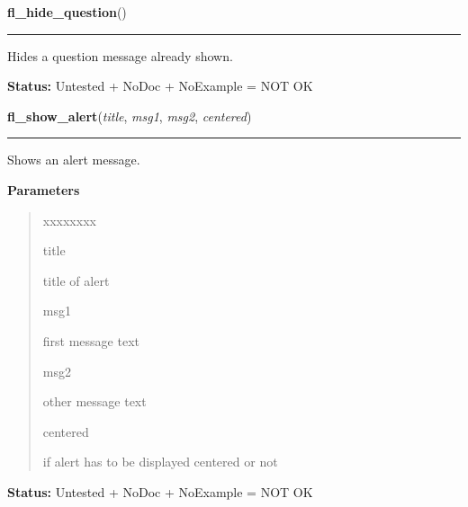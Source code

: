 \hspace{.8\funcindent}\begin{boxedminipage}{\funcwidth}

    \raggedright \textbf{fl\_hide\_question}()

    \vspace{-1.5ex}

    \rule{\textwidth}{0.5\fboxrule}
\setlength{\parskip}{2ex}
    Hides a question message already shown.

\setlength{\parskip}{1ex}
\textbf{Status:} Untested + NoDoc + NoExample = NOT OK



    \end{boxedminipage}

    \label{xformslib:library:fl_show_alert}

    \vspace{0.5ex}

\hspace{.8\funcindent}\begin{boxedminipage}{\funcwidth}

    \raggedright \textbf{fl\_show\_alert}(\textit{title}, \textit{msg1}, \textit{msg2}, \textit{centered})

    \vspace{-1.5ex}

    \rule{\textwidth}{0.5\fboxrule}
\setlength{\parskip}{2ex}
    Shows an alert message.

\setlength{\parskip}{1ex}
      \textbf{Parameters}
      \vspace{-1ex}

      \begin{quote}
        \begin{Ventry}{xxxxxxxx}

          \item[title]

          title of alert

          \item[msg1]

          first message text

          \item[msg2]

          other message text

          \item[centered]

          if alert has to be displayed centered or not

        \end{Ventry}

      \end{quote}

\textbf{Status:} Untested + NoDoc + NoExample = NOT OK



    \end{boxedminipage}

